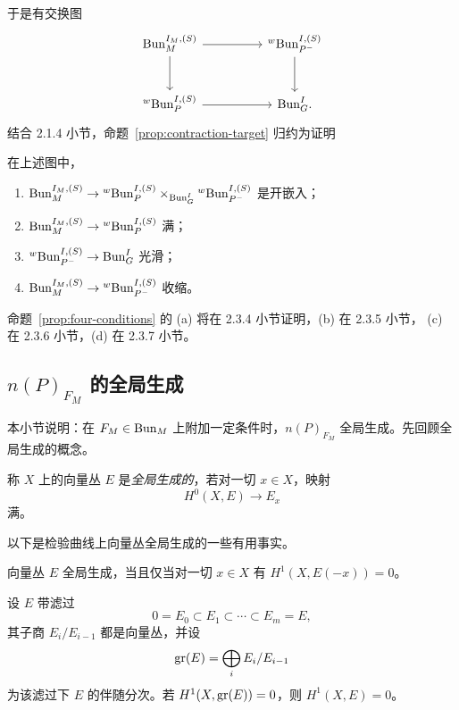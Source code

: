 于是有交换图
\[
\begin{tikzcd}[column sep=huge,row sep=large]
\Bun^{I_M,(S)}_M \arrow[r] \arrow[d] & {}^{w}\Bun^{I,(S)}_{P^-} \arrow[d]\\
{}^{w}\Bun^{I,(S)}_P \arrow[r] & \Bun^I_G .
\end{tikzcd}
\]
结合 2.1.4 小节，命题~\ref{prop:contraction-target} 归约为证明

\begin{proposition}
\label{prop:four-conditions}
在上述图中，
\begin{enumerate}
\item[(a)] $\mathrm{Bun}^{I_M,(S)}_M\to {}^{w}\mathrm{Bun}^{I,(S)}_P\times_{\mathrm{Bun}^I_G}{}^{w}\mathrm{Bun}^{I,(S)}_{P^-}$ 是开嵌入；
\item[(b)] $\mathrm{Bun}^{I_M,(S)}_M\to {}^{w}\mathrm{Bun}^{I,(S)}_P$ 满；
\item[(c)] ${}^{w}\mathrm{Bun}^{I,(S)}_{P^-}\to \mathrm{Bun}^I_G$ 光滑；
\item[(d)] $\mathrm{Bun}^{I_M,(S)}_M\to {}^{w}\mathrm{Bun}^{I,(S)}_{P^-}$ 收缩。
\end{enumerate}
\end{proposition}

命题~\ref{prop:four-conditions} 的 (a) 将在 2.3.4 小节证明，(b) 在 2.3.5 小节，
(c) 在 2.3.6 小节，(d) 在 2.3.7 小节。

\subsection{\texorpdfstring{$n(P)_{F_M}$ 的全局生成}{n(P)FM 的全局生成}}
\label{sec:nP-global}

本小节说明：在 $F_M\in \mathrm{Bun}_M$ 上附加一定条件时，$n(P)_{F_M}$ 全局生成。先回顾全局生成的概念。

\begin{definition}
\label{def:globally-generated}
称 $X$ 上的向量丛 $E$ 是\emph{全局生成的}，若对一切 $x\in X$，映射
\[
H^0(X,E)\to E_x
\]
满。
\end{definition}
以下是检验曲线上向量丛全局生成的一些有用事实。

\begin{lemma}
\label{lem:gg-h1}
向量丛 $E$ 全局生成，当且仅当对一切 $x\in X$ 有 $H^1(X,E(-x))=0$。
\end{lemma}

\begin{lemma}
\label{lem:gg-filtration}
设 $E$ 带滤过
\[
0=E_0\subset E_1\subset \cdots \subset E_m=E,
\]
其子商 $E_i/E_{i-1}$ 都是向量丛，并设
\[
\operatorname{gr}(E)=\bigoplus_i E_i/E_{i-1}
\]
为该滤过下 $E$ 的伴随分次。若 $H^1(X,\operatorname{gr}(E))=0$，则 $H^1(X,E)=0$。
\end{lemma}

